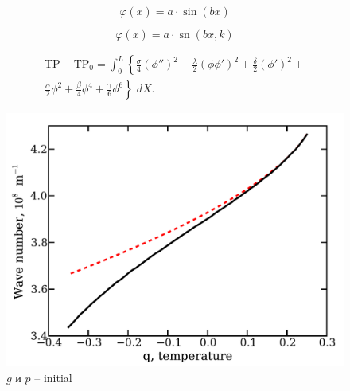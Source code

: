 \documentclass[trans]{beamer}
\DeclareMathOperator{\sn}{sn}
\begin{document}
\begin{frame}
\begin{equation*}
\varphi(x) = a \cdot \sin(bx)
\end{equation*}

\begin{equation*}
\varphi(x) = a  \cdot \sn(bx, k)
\end{equation*}

\begin{equation*}
\begin{aligned}
\mathrm{TP} - \mathrm{TP}_0 =
                      \int^L_0 \left\{\frac{\sigma}{4} \left( \phi'' \right)^2 +
                      \frac{\lambda}{2}\left(\phi\phi'\right)^2 +
                      \frac{\delta}{2}\left(\phi'\right)^2 +\right.\\
                      \left.\frac{\alpha}{2}\phi^2 + \frac{\beta}{4}\phi^4 +
                      \frac{\gamma}{6}\phi^6
                      \right\}\;dX.
\end{aligned}
\end{equation*}

\center

\begin{figure}
\includegraphics{figs/gpinit-wn.pdf}
\caption{$g$ и $p$ -- initial}
\end{figure}

\end{frame}
\end{document}
